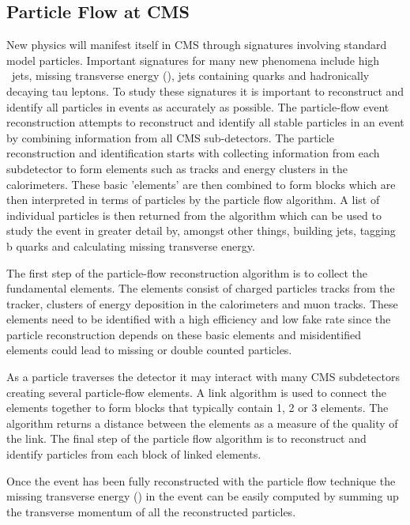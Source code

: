 \subsection{Particle Flow at CMS}

New physics will manifest itself in CMS through signatures involving standard
model particles. Important signatures for many new phenomena include high \Pt\
jets, missing transverse energy (\met), jets containing \Pbottom quarks and
hadronically decaying tau leptons. To study these signatures it is important to
reconstruct and identify all particles in events as accurately as possible. The
particle-flow event reconstruction attempts to reconstruct and identify all
stable particles in an event by combining information from all CMS
sub-detectors. The particle reconstruction and identification starts with
collecting information from each subdetector to form elements such as tracks
and energy clusters in the calorimeters. These basic 'elements' are then
combined to form blocks which are then interpreted in terms of particles by the
particle flow algorithm. A list of individual particles is then returned from
the algorithm which can be used to study the event in greater detail by,
amongst other things, building jets, tagging b quarks and calculating missing
transverse energy.\cite{PF}

The first step of the particle-flow reconstruction algorithm is to collect the
fundamental elements. The elements consist of charged particles tracks from the
tracker, clusters of energy deposition in the calorimeters and muon tracks.
These elements need to be identified with a high efficiency and low fake rate
since the particle reconstruction depends on these basic elements and
misidentified elements could lead to missing or double counted
particles.\cite{PF}

As a particle traverses the detector it may interact with many CMS subdetectors
creating several particle-flow elements. A link algorithm is used to connect
the elements together to form blocks that typically contain 1, 2 or 3 elements.
The algorithm returns a distance between the elements as a measure of the
quality of the link. The final step of the particle flow algorithm is to
reconstruct and identify particles from each block of linked elements.\cite{PF}

Once the event has been fully reconstructed with the particle flow technique
the missing transverse energy (\met) in the event can be easily computed by
summing up the transverse momentum of all the reconstructed particles.\cite{PF}

